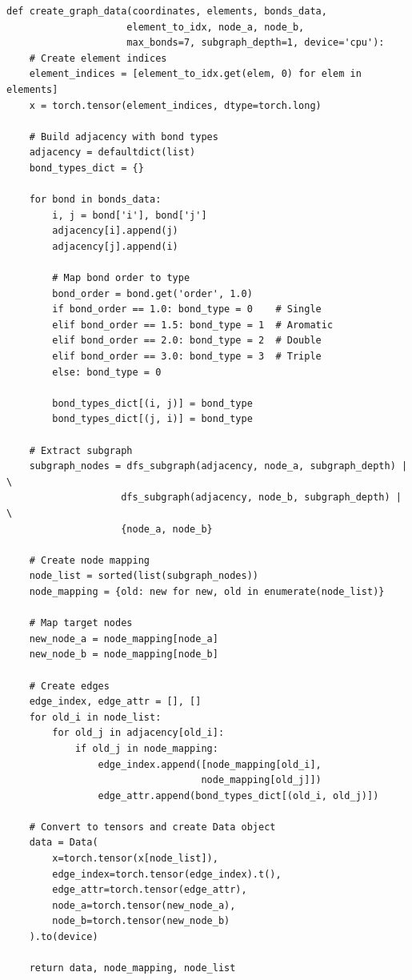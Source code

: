 \documentclass[11pt,a4paper]{article}
\begin{document}
\begin{lstlisting}[caption={Create Graph Data (lines 142-249)}]
def create_graph_data(coordinates, elements, bonds_data,
                     element_to_idx, node_a, node_b,
                     max_bonds=7, subgraph_depth=1, device='cpu'):
    # Create element indices
    element_indices = [element_to_idx.get(elem, 0) for elem in elements]
    x = torch.tensor(element_indices, dtype=torch.long)

    # Build adjacency with bond types
    adjacency = defaultdict(list)
    bond_types_dict = {}

    for bond in bonds_data:
        i, j = bond['i'], bond['j']
        adjacency[i].append(j)
        adjacency[j].append(i)

        # Map bond order to type
        bond_order = bond.get('order', 1.0)
        if bond_order == 1.0: bond_type = 0    # Single
        elif bond_order == 1.5: bond_type = 1  # Aromatic
        elif bond_order == 2.0: bond_type = 2  # Double
        elif bond_order == 3.0: bond_type = 3  # Triple
        else: bond_type = 0

        bond_types_dict[(i, j)] = bond_type
        bond_types_dict[(j, i)] = bond_type

    # Extract subgraph
    subgraph_nodes = dfs_subgraph(adjacency, node_a, subgraph_depth) | \
                    dfs_subgraph(adjacency, node_b, subgraph_depth) | \
                    {node_a, node_b}

    # Create node mapping
    node_list = sorted(list(subgraph_nodes))
    node_mapping = {old: new for new, old in enumerate(node_list)}

    # Map target nodes
    new_node_a = node_mapping[node_a]
    new_node_b = node_mapping[node_b]

    # Create edges
    edge_index, edge_attr = [], []
    for old_i in node_list:
        for old_j in adjacency[old_i]:
            if old_j in node_mapping:
                edge_index.append([node_mapping[old_i],
                                  node_mapping[old_j]])
                edge_attr.append(bond_types_dict[(old_i, old_j)])

    # Convert to tensors and create Data object
    data = Data(
        x=torch.tensor(x[node_list]),
        edge_index=torch.tensor(edge_index).t(),
        edge_attr=torch.tensor(edge_attr),
        node_a=torch.tensor(new_node_a),
        node_b=torch.tensor(new_node_b)
    ).to(device)

    return data, node_mapping, node_list
\end{lstlisting}
\end{document}
